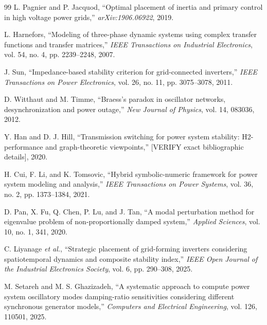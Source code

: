 \documentclass[11pt]{article}
\begin{document}
\begin{thebibliography}{99}
L. Pagnier and P. Jacquod, ``Optimal placement of inertia and primary control
in high voltage power grids,'' \emph{arXiv:1906.06922}, 2019.

L. Harnefors, ``Modeling of three-phase dynamic systems using complex transfer
functions and transfer matrices,'' \emph{IEEE Transactions on Industrial
Electronics}, vol. 54, no. 4, pp. 2239--2248, 2007.

J. Sun, ``Impedance-based stability criterion for grid-connected inverters,''
\emph{IEEE Transactions on Power Electronics}, vol. 26, no. 11,
pp. 3075--3078, 2011.

D. Witthaut and M. Timme, ``Braess's paradox in oscillator networks,
desynchronization and power outage,'' \emph{New Journal of Physics}, vol. 14,
083036, 2012.

Y. Han and D. J. Hill, ``Transmission switching for power system stability:
H2-performance and graph-theoretic viewpoints,'' [VERIFY exact bibliographic
details], 2020.

H. Cui, F. Li, and K. Tomsovic, ``Hybrid symbolic-numeric framework for power
system modeling and analysis,'' \emph{IEEE Transactions on Power Systems},
vol. 36, no. 2, pp. 1373--1384, 2021.

D. Pan, X. Fu, Q. Chen, P. Lu, and J. Tan, ``A modal perturbation method for
eigenvalue problem of non-proportionally damped system,'' \emph{Applied
Sciences}, vol. 10, no. 1, 341, 2020.

C. Liyanage \emph{et al.}, ``Strategic placement of grid-forming inverters
considering spatiotemporal dynamics and composite stability index,''
\emph{IEEE Open Journal of the Industrial Electronics Society}, vol. 6,
pp. 290--308, 2025.

M. Setareh and M. S. Ghazizadeh, ``A systematic approach to compute power
system oscillatory modes damping-ratio sensitivities considering different
synchronous generator models,'' \emph{Computers and Electrical Engineering},
vol. 126, 110501, 2025.

\end{thebibliography}
\end{document}
